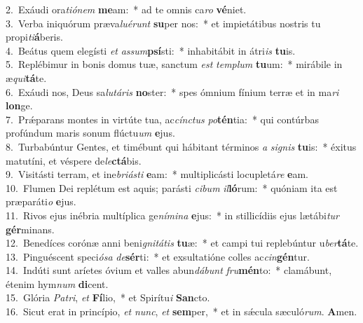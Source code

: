 {2.~}Exáudi ora\textit{ti}\textit{ó}\textit{nem} \textbf{me}am:~* ad te omnis ca\textit{ro} \textbf{vé}niet.\\
{3.~}Verba iniquórum præva\textit{lu}\textit{é}\textit{runt} \textbf{su}per nos:~* et impietátibus nostris tu propi\textit{ti}\textbf{á}beris.\\
{4.~}Beátus quem elegísti \textit{et} \textit{as}\textit{sum}\textbf{psí}sti:~* inhabitábit in átri\textit{is} \textbf{tu}is.\\
{5.~}Replébimur in bonis domus tuæ, sanctum \textit{est} \textit{tem}\textit{plum} \textbf{tu}um:~* mirábile in æ\textit{qui}\textbf{tá}te.\\
{6.~}Exáudi nos, Deus sa\textit{lu}\textit{tá}\textit{ris} \textbf{no}ster:~* spes ómnium fínium terræ et in ma\textit{ri} \textbf{lon}ge.\\
{7.~}Prǽparans montes in virtúte tua, ac\textit{cín}\textit{ctus} \textit{po}\textbf{tén}tia:~* qui contúrbas profúndum maris sonum flúctu\textit{um} \textbf{e}jus.\\
{8.~}Turbabúntur Gentes, et timébunt qui hábitant términos \textit{a} \textit{si}\textit{gnis} \textbf{tu}is:~* éxitus matutíni, et véspere de\textit{le}\textbf{ctá}bis.\\
{9.~}Visitásti terram, et ine\textit{bri}\textit{á}\textit{sti} \textbf{e}am:~* multiplicásti locupletá\textit{re} \textbf{e}am.\\
{10.~}Flumen Dei replétum est aquis; parásti \textit{ci}\textit{bum} \textit{il}\textbf{ló}rum:~* quóniam ita est præparáti\textit{o} \textbf{e}jus.\\
{11.~}Rivos ejus inébria multíplica ge\textit{ní}\textit{mi}\textit{na} \textbf{e}jus:~* in stillicídiis ejus lætábi\textit{tur} \textbf{gér}minans.\\
{12.~}Benedíces corónæ anni beni\textit{gni}\textit{tá}\textit{tis} \textbf{tu}æ:~* et campi tui replebúntur u\textit{ber}\textbf{tá}te.\\
{13.~}Pinguéscent speci\textit{ó}\textit{sa} \textit{de}\textbf{sér}ti:~* et exsultatióne colles ac\textit{cin}\textbf{gén}tur.\\
{14.~}Indúti sunt aríetes óvium et valles abun\textit{dá}\textit{bunt} \textit{fru}\textbf{mén}to:~* clamábunt, étenim hym\textit{num} \textbf{di}cent.\\
{15.~}Glória \textit{Pa}\textit{tri}, \textit{et} \textbf{Fí}lio,~* et Spirítu\textit{i} \textbf{San}cto.\\
{16.~}Sicut erat in princípio, \textit{et} \textit{nunc}, \textit{et} \textbf{sem}per,~* et in sǽcula sæculó\textit{rum}. \textbf{A}men.\\
